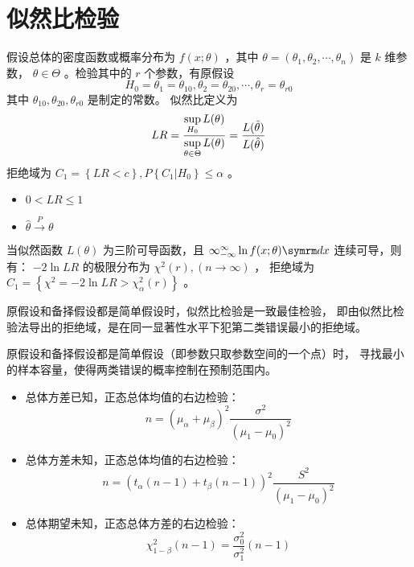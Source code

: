 \section{似然比检验}

 假设总体的密度函数或概率分布为 $ f(x;\theta) $ ，其中 $ \theta = (\theta_1, \theta_2, \cdots, \theta_n) $
是 $ k $ 维参数， $ \theta \in \Theta $ 。检验其中的 $ r $ 个参数，有原假设
$$ H_0 = \theta_1 = \theta_{10}, \theta_2 = \theta_{20}, \cdots, \theta_r = \theta_{r0} $$
其中 $ \theta_{10}, \theta_{20}, \theta_{r0} $ 是制定的常数。
似然比定义为
\begin{equation}
    LR = \displaystyle{\frac{\displaystyle{\sup_{H_0} L(\theta)}}{\displaystyle{\sup_{\theta\in\Theta}L(\theta)}}} = \frac{L(\tilde{\theta})}{L(\hat{\theta})}
\end{equation}
拒绝域为 $ C_1 = \left\{ LR < c \right\} , P\left\{ C_1 | H_0 \right\} \leqslant \alpha $ 。

\begin{itemize}[leftmargin=\paritemindent]
    \item $ 0 < LR \leqslant 1 $
    \item $ \hat{\theta} \xrightarrow{P} \theta $
\end{itemize}

 当似然函数 $ L(\theta) $ 为三阶可导函数，且 $ \infty_{-\infty}^{\infty} \ln f(x;\theta) \diff x $
连续可导，则有： $ -2\ln LR $ 的极限分布为 $ \chi^2(r), (n \rightarrow \infty) $ ，
拒绝域为 $ C_1 = \left\{ \chi^2 = -2\ln LR > \chi_\alpha^2(r) \right\}  $ 。

 原假设和备择假设都是简单假设时，似然比检验是一致最佳检验，
即由似然比检验法导出的拒绝域，是在同一显著性水平下犯第二类错误最小的拒绝域。

 原假设和备择假设都是简单假设（即参数只取参数空间的一个点）时，
寻找最小的样本容量，使得两类错误的概率控制在预制范围内。

\begin{itemize}[leftmargin=\paritemindent]
    \item 总体方差已知，正态总体均值的右边检验：
    \begin{equation}
        n = (\mu_\alpha + \mu_\beta)^2 \frac{\sigma^2}{(\mu_1 - \mu_0)^2}
    \end{equation}
    \item 总体方差未知，正态总体均值的右边检验：
    \begin{equation}
        n = (t_\alpha(n-1) + t_\beta(n-1))^2 \frac{S^2}{(\mu_1 - \mu_0)^2}
    \end{equation}
    \item 总体期望未知，正态总体方差的右边检验：
    \begin{equation}
        \chi_{1-\beta}^{2}(n-1) = \frac{\sigma_0^2}{\sigma_1^2}(n-1)
    \end{equation}
\end{itemize}
 